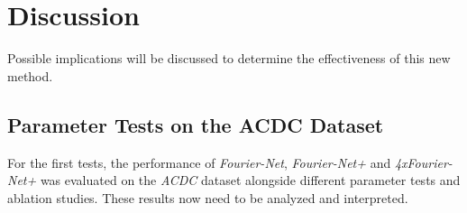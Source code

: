 
\chapter{Discussion} \label{Ch:Discussion}
Possible implications will be discussed to determine the effectiveness of this new method.

\section{Parameter Tests on the ACDC Dataset} \label{Sec:DiscussionParameterTestsACDC}
For the first tests, the performance of \emph{Fourier-Net}, \emph{Fourier-Net+} and \emph{4xFourier-Net+} was evaluated on the \emph{ACDC} dataset alongside different parameter tests and ablation studies. These results now need to be analyzed and interpreted.

